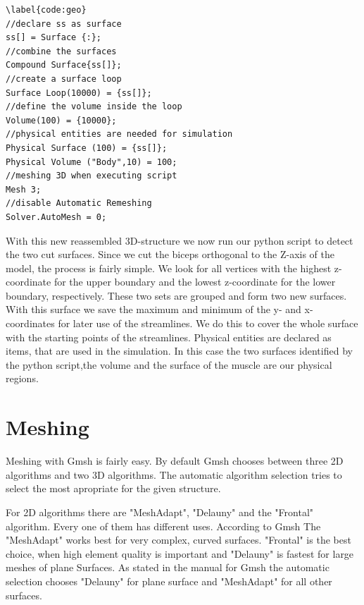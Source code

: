 \documentclass[preprint,journal]{vgtc}       %
\begin{document}
\begin{verbatim}
\label{code:geo}
//declare ss as surface
ss[] = Surface {:};
//combine the surfaces
Compound Surface{ss[]};
//create a surface loop
Surface Loop(10000) = {ss[]};
//define the volume inside the loop
Volume(100) = {10000};
//physical entities are needed for simulation
Physical Surface (100) = {ss[]};
Physical Volume ("Body",10) = 100;
//meshing 3D when executing script
Mesh 3;
//disable Automatic Remeshing
Solver.AutoMesh = 0;
\end{verbatim}

With this new reassembled 3D-structure we now run our python script to detect the two cut surfaces. Since we cut the biceps orthogonal to the Z-axis of the model, the process is fairly simple.
We look for all vertices with the highest z-coordinate for the upper boundary and the lowest z-coordinate for the lower boundary, respectively.
These two sets are grouped and form two new surfaces. With this surface we save the maximum and minimum of the y- and x- coordinates for later use of the streamlines. 
We do this to cover the whole surface with the starting points of the streamlines.
Physical entities are declared as items, that are used in the simulation. 
In this case the two surfaces identified by the python script,the volume and the surface of the muscle are our physical regions. 

\section{Meshing}
Meshing with Gmsh is fairly easy. By default Gmsh chooses between three 2D algorithms and two 3D algorithms.
The automatic algorithm selection tries to select the most apropriate for the given structure.

For 2D algorithms there are "MeshAdapt", "Delauny" and the "Frontal" algorithm.
Every one of them has different uses. According to Gmsh The "MeshAdapt" works best for very complex, curved surfaces.
"Frontal" is the best choice, when high element quality is important and "Delauny" is fastest for large meshes of plane Surfaces.
As stated in the manual for Gmsh the automatic selection chooses "Delauny" for plane surface and "MeshAdapt" for all other surfaces. 
\end{document}
